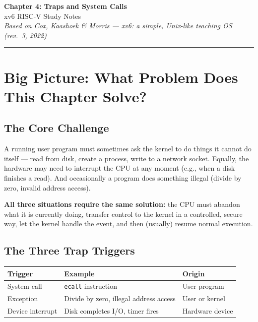 \documentclass[11pt, a4paper]{article}
\begin{document}
\begin{center}
  {\LARGE\bfseries\sffamily Chapter 4: Traps and System Calls}\\[0.4em]
  {\large\sffamily xv6 RISC-V Study Notes}\\[0.2em]
  {\small\itshape Based on Cox, Kaashoek \& Morris --- \emph{xv6: a simple, Unix-like teaching OS} (rev.\ 3, 2022)}
\end{center}

\vspace{0.5em}
\hrule
\vspace{1em}

\section{Big Picture: What Problem Does This Chapter Solve?}

\subsection{The Core Challenge}

A running user program must sometimes ask the kernel to do things it cannot do itself --- read from disk, create a process, write to a network socket.
Equally, the hardware may need to interrupt the CPU at any moment (e.g., when a disk finishes a read).
And occasionally a program does something illegal (divide by zero, invalid address access).

\textbf{All three situations require the same solution:} the CPU must abandon what it is currently doing, transfer control to the kernel in a controlled, secure way, let the kernel handle the event, and then (usually) resume normal execution.

\subsection{The Three Trap Triggers}

\begin{center}
\begin{tabular}{@{}lll@{}}
\toprule
\textbf{Trigger}   & \textbf{Example}                           & \textbf{Origin} \\
\midrule
System call        & \lstinline|ecall| instruction              & User program \\
Exception          & Divide by zero, illegal address access     & User or kernel \\
Device interrupt   & Disk completes I/O, timer fires            & Hardware device \\
\bottomrule
\end{tabular}
\end{center}
\end{document}
